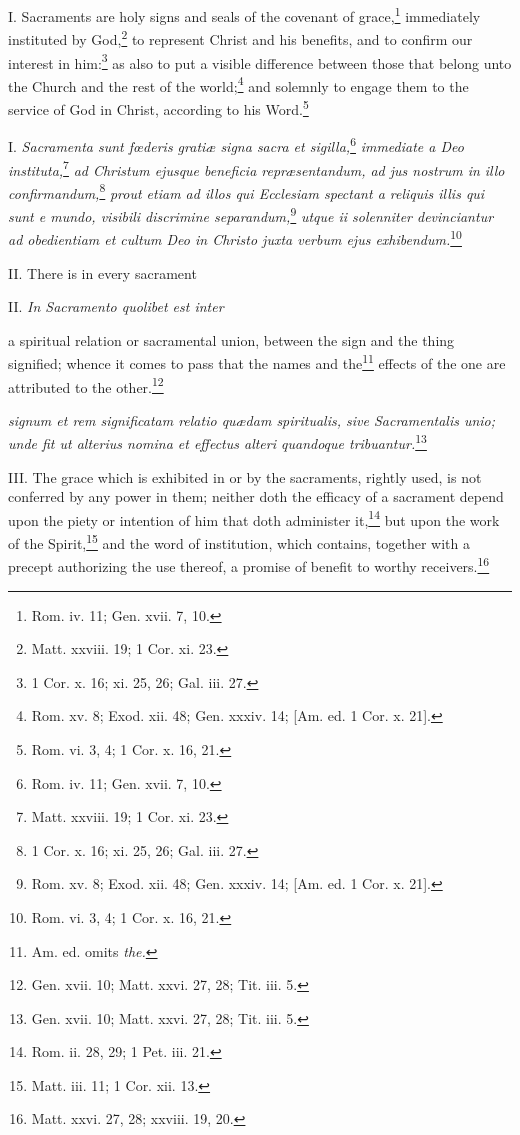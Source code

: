 I. Sacraments are holy signs and seals of the covenant of grace,\footnote{Rom. iv. 11; Gen. xvii. 7, 10.} immediately instituted by God,\footnote{Matt. xxviii. 19; 1 Cor. xi. 23.} to represent Christ and his benefits, and to confirm our interest in him:\footnote{1 Cor. x. 16; xi. 25, 26; Gal. iii. 27.} as also to put a visible difference between those that belong unto the Church and the rest of the world;\footnote{Rom. xv. 8; Exod. xii. 48; Gen. xxxiv. 14; [Am. ed. 1 Cor. x. 21].} and solemnly to engage them to the service of God in Christ, according to his Word.\footnote{Rom. vi. 3, 4; 1 Cor. x. 16, 21.}

I. \emph{Sacramenta sunt fœderis gratiæ signa sacra et sigilla,}\footnote{Rom. iv. 11; Gen. xvii. 7, 10.}\emph{ immediate a Deo instituta,}\footnote{Matt. xxviii. 19; 1 Cor. xi. 23.}\emph{ ad Christum ejusque beneficia repræsentandum, ad jus nostrum in illo confirmandum,}\footnote{1 Cor. x. 16; xi. 25, 26; Gal. iii. 27.}\emph{ prout etiam ad illos qui Ecclesiam spectant a reliquis illis qui sunt e mundo, visibili discrimine separandum,}\footnote{Rom. xv. 8; Exod. xii. 48; Gen. xxxiv. 14; [Am. ed. 1 Cor. x. 21].}\emph{ utque ii solenniter devinciantur ad obedientiam et cultum Deo in Christo juxta verbum ejus exhibendum.}\footnote{Rom. vi. 3, 4; 1 Cor. x. 16, 21.}

II. There is in every sacrament

II. \emph{In Sacramento quolibet est inter }

a spiritual relation or sacramental union, between the sign and the thing signified; whence it comes to pass that the names and the\footnote{Am. ed. omits \emph{the.}} effects of the one are attributed to the other.\footnote{Gen. xvii. 10; Matt. xxvi. 27, 28; Tit. iii. 5.}

\emph{signum et rem significatam relatio quædam spiritualis, sive Sacramentalis unio; unde fit ut alterius nomina et effectus alteri quandoque tribuantur.}\footnote{Gen. xvii. 10; Matt. xxvi. 27, 28; Tit. iii. 5.}

III. The grace which is exhibited in or by the sacraments, rightly used, is not conferred by any power in them; neither doth the efficacy of a sacrament depend upon the piety or intention of him that doth administer it,\footnote{Rom. ii. 28, 29; 1 Pet. iii. 21.} but upon the work of the Spirit,\footnote{Matt. iii. 11; 1 Cor. xii. 13.} and the word of institution, which contains, together with a precept authorizing the use thereof, a promise of benefit to worthy receivers.\footnote{Matt. xxvi. 27, 28; xxviii. 19, 20.}


